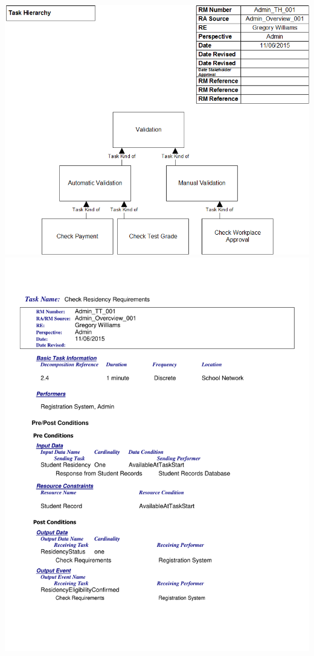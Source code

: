 \documentclass{article}
\begin{document}
	\\
	\includegraphics[width=\textwidth]{TaskHierarchy}
	\\
	\includegraphics[width=\textwidth]{Task}
\end{document}
